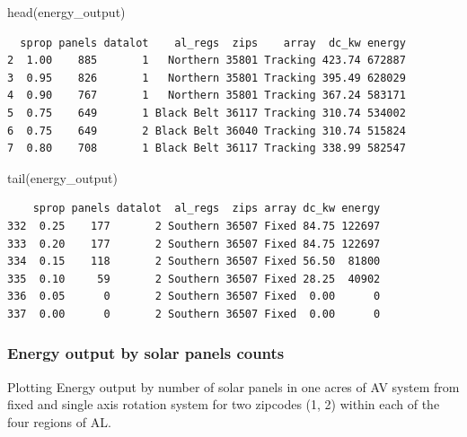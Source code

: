 \documentclass[
  letterpaper,
  DIV=11,
  numbers=noendperiod]{scrartcl}
\newenvironment{Shaded}{\begin{snugshade}}{\end{snugshade}}
\newcommand{\FunctionTok}[1]{\textcolor[rgb]{0.28,0.35,0.67}{#1}}
\newcommand{\NormalTok}[1]{\textcolor[rgb]{0.00,0.23,0.31}{#1}}
\begin{document}
\begin{Shaded}
\begin{Highlighting}[]
\FunctionTok{head}\NormalTok{(energy\_output)}
\end{Highlighting}
\end{Shaded}

\begin{verbatim}
  sprop panels datalot    al_regs  zips    array  dc_kw energy
2  1.00    885       1   Northern 35801 Tracking 423.74 672887
3  0.95    826       1   Northern 35801 Tracking 395.49 628029
4  0.90    767       1   Northern 35801 Tracking 367.24 583171
5  0.75    649       1 Black Belt 36117 Tracking 310.74 534002
6  0.75    649       2 Black Belt 36040 Tracking 310.74 515824
7  0.80    708       1 Black Belt 36117 Tracking 338.99 582547
\end{verbatim}

\begin{Shaded}
\begin{Highlighting}[]
\FunctionTok{tail}\NormalTok{(energy\_output)}
\end{Highlighting}
\end{Shaded}

\begin{verbatim}
    sprop panels datalot  al_regs  zips array dc_kw energy
332  0.25    177       2 Southern 36507 Fixed 84.75 122697
333  0.20    177       2 Southern 36507 Fixed 84.75 122697
334  0.15    118       2 Southern 36507 Fixed 56.50  81800
335  0.10     59       2 Southern 36507 Fixed 28.25  40902
336  0.05      0       2 Southern 36507 Fixed  0.00      0
337  0.00      0       2 Southern 36507 Fixed  0.00      0
\end{verbatim}

\subsubsection{Energy output by solar panels
counts}\label{energy-output-by-solar-panels-counts}

Plotting Energy output by number of solar panels in one acres of AV
system from fixed and single axis rotation system for two zipcodes (1,
2) within each of the four regions of AL.
\end{document}
